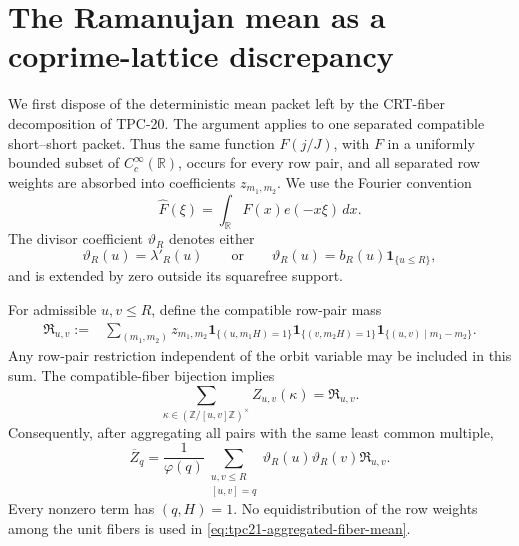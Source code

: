\section{The Ramanujan mean as a coprime-lattice discrepancy}
\label{sec:tpc21-mean-closure}

We first dispose of the deterministic mean packet left by the
CRT-fiber decomposition of TPC-20.  The argument applies to one
separated compatible short--short packet.  Thus the same function
\(F(j/J)\), with \(F\) in a uniformly bounded subset of
\(C_c^\infty(\mathbb R)\), occurs for every row pair, and all separated
row weights are absorbed into coefficients \(z_{m_1,m_2}\).  We use
the Fourier convention
\begin{equation}
 \widehat F(\xi)=\int_{\mathbb R}F(x)e(-x\xi)\,dx.
 \label{eq:tpc21-Fourier-convention}
\end{equation}
The divisor coefficient \(\vartheta_R\) denotes either
\begin{equation}
 \vartheta_R(u)=\lambda'_R(u)
 \qquad\text{or}\qquad
 \vartheta_R(u)=b_R(u)\mathbf 1_{\{u\le R\}},
 \label{eq:tpc21-two-theta-choices}
\end{equation}
and is extended by zero outside its squarefree support.

For admissible \(u,v\le R\), define the compatible row-pair mass
\begin{align}
 \mathfrak R_{u,v}
 :={}&\sum_{(m_1,m_2)}z_{m_1,m_2}
 \mathbf 1_{\{(u,m_1H)=1\}}
 \mathbf 1_{\{(v,m_2H)=1\}}
 \mathbf 1_{\{(u,v)\mid m_1-m_2\}}.
 \label{eq:tpc21-compatible-row-mass}
\end{align}
Any row-pair restriction independent of the orbit variable may be
included in this sum.  The compatible-fiber bijection implies
\begin{equation}
 \sum_{\kappa\in(\mathbb Z/[u,v]\mathbb Z)^\times}
 Z_{u,v}(\kappa)=\mathfrak R_{u,v}.
 \label{eq:tpc21-fiber-total-mass}
\end{equation}
Consequently, after aggregating all pairs with the same least common
multiple,
\begin{equation}
 \boxed{
 \overline Z_q
 =\frac1{\varphi(q)}
 \sum_{\substack{u,v\le R\\{}[u,v]=q}}
 \vartheta_R(u)\vartheta_R(v)\mathfrak R_{u,v}.}
 \label{eq:tpc21-aggregated-fiber-mean}
\end{equation}
Every nonzero term has \((q,H)=1\).  No equidistribution of the row
weights among the unit fibers is used in
\eqref{eq:tpc21-aggregated-fiber-mean}.

